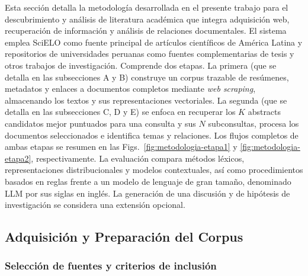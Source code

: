 \documentclass[conference]{IEEEtran}
\begin{document}






Esta sección detalla la metodología desarrollada en el presente trabajo para el descubrimiento y análisis de literatura académica que integra adquisición web, recuperación de información y análisis de relaciones documentales. El sistema emplea SciELO como fuente principal de artículos científicos de América Latina y repositorios de universidades peruanas como fuentes complementarias de tesis y otros trabajos de investigación. Comprende dos etapas. La primera (que se detalla en las subsecciones A y B) construye un corpus trazable de resúmenes, metadatos y enlaces a documentos completos mediante \textit{web scraping}, almacenando los textos y sus representaciones vectoriales. La segunda (que se detalla en las subsecciones C, D y E) se enfoca en recuperar los $K$ abstracts candidatos mejor puntuados para una consulta y sus $N$ subconsultas, procesa los documentos seleccionados e identifica temas y relaciones. Los flujos completos de ambas etapas se resumen en las Figs.~\ref{fig:metodologia-etapa1} y \ref{fig:metodologia-etapa2}, respectivamente. La evaluación compara métodos léxicos, representaciones distribucionales y modelos contextuales, así como procedimientos basados en reglas frente a un modelo de lenguaje de gran tamaño, denominado LLM por sus siglas en inglés. La generación de una discusión y de hipótesis de investigación se considera una extensión opcional.

\subsection{Adquisición y Preparación del Corpus}
\label{subsec:adquisicion}

\subsubsection{Selección de fuentes y criterios de inclusión}
\end{document}
